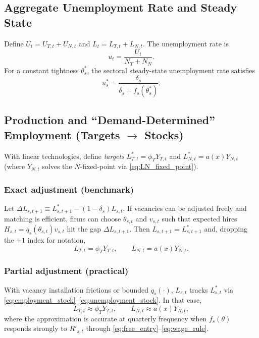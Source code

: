 \subsection*{Aggregate Unemployment Rate and Steady State}
\label{subsec:urate}
Define $U_t=U_{T,t}+U_{N,t}$ and $L_t=L_{T,t}+L_{N,t}$. The unemployment rate is
\begin{equation}
	u_t=\frac{U_t}{N_T+N_N}.
	\label{eq:urate_def}
\end{equation}
For a constant tightness $\theta_s^\ast$, the sectoral steady-state unemployment rate satisfies
\begin{equation}
	u_s^\ast=\frac{\delta_s}{\delta_s+f_s(\theta_s^\ast)}.
	\label{eq:usteady}
\end{equation}

\subsection*{Production and ``Demand-Determined'' Employment (Targets \texorpdfstring{$\rightarrow$}{->} Stocks)}
With linear technologies, define \textit{targets} $L_{T,t}^\ast=\phi_TY_{T,t}$ and $L_{N,t}^\ast=a(x)Y_{N,t}$ (where $Y_{N,t}$ solves the $N$-fixed-point via \eqref{eq:LN_fixed_point}). 

\subsubsection*{Exact adjustment (benchmark)}
Let $\Delta L_{s,t+1}\equiv L_{s,t+1}^\ast-(1-\delta_s)L_{s,t}$. If vacancies can be adjusted freely and matching is efficient, firms can choose $\theta_{s,t}$ and $v_{s,t}$ such that expected hires $H_{s,t}=q_s(\theta_{s,t})v_{s,t}$ hit the gap $\Delta L_{s,t+1}$. Then $L_{s,t+1}=L_{s,t+1}^\ast$ and, dropping the $+1$ index for notation,
\begin{equation}
	L_{T,t}=\phi_T Y_{T,t},\qquad L_{N,t}=a(x)Y_{N,t}.
	\label{eq:LT_LN_equal}
\end{equation}

\subsubsection*{Partial adjustment (practical)}
With vacancy installation frictions or bounded $q_s(\cdot)$, $L_{s,t}$ tracks $L_{s,t}^\ast$ via \eqref{eq:employment_stock}–\eqref{eq:unemployment_stock}. In that case,
\begin{equation}
	L_{T,t}\approx \phi_T Y_{T,t},\qquad L_{N,t}\approx a(x)Y_{N,t},
	\label{eq:LT_LN_approx}
\end{equation}
where the approximation is accurate at quarterly frequency when $f_s(\theta)$ responds strongly to $R'_{s,t}$ through \eqref{eq:free_entry}–\eqref{eq:wage_rule}.

